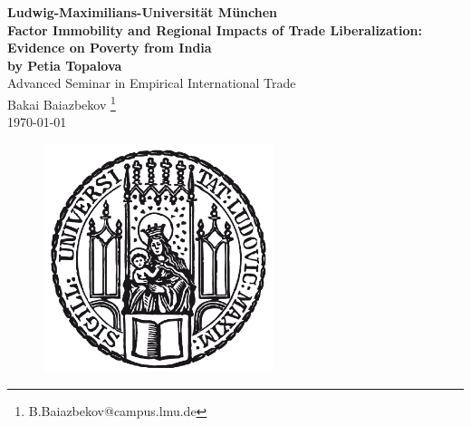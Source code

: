 \documentclass[a4paper,12pt]{article}
\begin{document}
\begin{titlepage}
\begin{center}
		{\Large \textbf{Ludwig-Maximilians-Universität München}} \\
	\vspace{35mm}
{\bfseries\LARGE{Factor Immobility and Regional Impacts of Trade Liberalization: Evidence on Poverty from India}} \\{\bfseries\large{by Petia Topalova}} 
			\vspace{10mm}\\
            {\Large Advanced Seminar in Empirical International Trade } \\
			\vspace{2mm}
            {\Large{Bakai Baiazbekov
		\renewcommand\thefootnote{*}\footnote{B.Baiazbekov@campus.lmu.de}}}\\
        {\today}	\\
		\vspace{8mm}
		\begin{figure}[h] 
        \begin{center}
\includegraphics[width=0.6\textwidth]{lmu_siegel.png} \
\end{center}
\end{figure}%
	\end{center}

\end{titlepage}


\setcounter{page}{2}
\tableofcontents  
\newpage



\setcounter{page}{1}
\newpage
\end{document}
